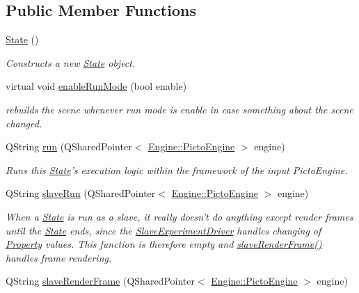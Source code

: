 \subsection*{Public Member Functions}
\begin{DoxyCompactItemize}
\item 
\hyperlink{class_picto_1_1_state_a05d3d45aca98c85e3305cf4da2ccd15f}{State} ()
\begin{DoxyCompactList}\small\item\em Constructs a new \hyperlink{class_picto_1_1_state}{State} object. \end{DoxyCompactList}\item 
\hypertarget{class_picto_1_1_state_a8aba2f6f77d66d14ca3ae5973af7584c}{virtual void \hyperlink{class_picto_1_1_state_a8aba2f6f77d66d14ca3ae5973af7584c}{enable\-Run\-Mode} (bool enable)}\label{class_picto_1_1_state_a8aba2f6f77d66d14ca3ae5973af7584c}

\begin{DoxyCompactList}\small\item\em rebuilds the scene whenever run mode is enable in case something about the scene changed. \end{DoxyCompactList}\item 
Q\-String \hyperlink{class_picto_1_1_state_abd02d3ab244f4ff544e916b577c97213}{run} (Q\-Shared\-Pointer$<$ \hyperlink{class_picto_1_1_engine_1_1_picto_engine}{Engine\-::\-Picto\-Engine} $>$ engine)
\begin{DoxyCompactList}\small\item\em Runs this \hyperlink{class_picto_1_1_state}{State}'s execution logic within the framework of the input Picto\-Engine. \end{DoxyCompactList}\item 
\hypertarget{class_picto_1_1_state_a853ee2b157c1c7ae8fee0898891d430c}{Q\-String \hyperlink{class_picto_1_1_state_a853ee2b157c1c7ae8fee0898891d430c}{slave\-Run} (Q\-Shared\-Pointer$<$ \hyperlink{class_picto_1_1_engine_1_1_picto_engine}{Engine\-::\-Picto\-Engine} $>$ engine)}\label{class_picto_1_1_state_a853ee2b157c1c7ae8fee0898891d430c}

\begin{DoxyCompactList}\small\item\em When a \hyperlink{class_picto_1_1_state}{State} is run as a slave, it really doesn't do anything except render frames until the \hyperlink{class_picto_1_1_state}{State} ends, since the \hyperlink{class_picto_1_1_slave_experiment_driver}{Slave\-Experiment\-Driver} handles changing of \hyperlink{class_picto_1_1_property}{Property} values. This function is therefore empty and \hyperlink{class_picto_1_1_state_a6daa792c1055a50bef88729ba46ece64}{slave\-Render\-Frame()} handles frame rendering. \end{DoxyCompactList}\item 
\hypertarget{class_picto_1_1_state_a6daa792c1055a50bef88729ba46ece64}{Q\-String \hyperlink{class_picto_1_1_state_a6daa792c1055a50bef88729ba46ece64}{slave\-Render\-Frame} (Q\-Shared\-Pointer$<$ \hyperlink{class_picto_1_1_engine_1_1_picto_engine}{Engine\-::\-Picto\-Engine} $>$ engine)}\label{class_picto_1_1_state_a6daa792c1055a50bef88729ba46ece64}


\end{DoxyCompactItemize}
